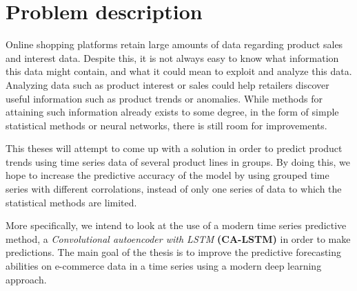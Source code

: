 
\section{Problem description}
\label{section:Introduction:ProblemDescription}
Online shopping platforms retain large amounts of data regarding product sales and interest data.
Despite this, it is not always easy to know what information this data might contain, and what it could mean to exploit and analyze this data.
Analyzing data such as product interest or sales could help retailers discover useful information such as product trends or anomalies.
While methods for attaining such information already exists to some degree, in the form of simple statistical methods or neural networks,
there is still room for improvements.


This theses will attempt to come up with a solution in order to predict product trends using time series data of several product lines in groups.
By doing this, we hope to increase the predictive accuracy of the model by using grouped time series with different corrolations,
instead of only one series of data to which the statistical methods are limited.

More specifically, we intend to look at the use of a modern time series predictive method, a \textit{Convolutional autoencoder with LSTM} \textbf{(CA-LSTM)} in order to make predictions.
The main goal of the thesis is to improve the predictive forecasting abilities on e-commerce data in a time series using a modern deep learning approach.
